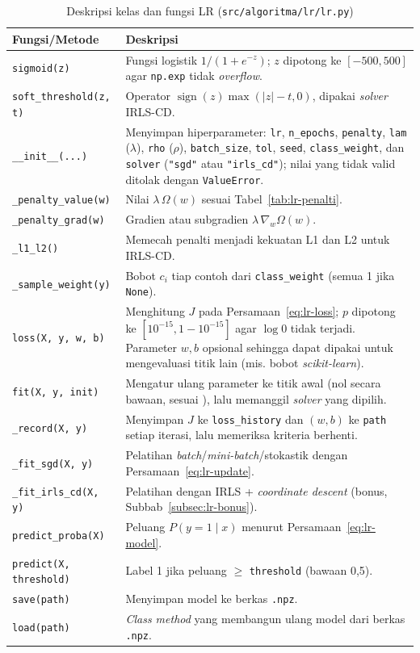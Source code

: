 \begin{table}[H]
	\centering
	\caption{Deskripsi kelas dan fungsi LR (\texttt{src/algoritma/lr/lr.py})}
	\label{tab:lr-fungsi}
	\small
	\begin{tabularx}{\textwidth}{l Y}
		\toprule
		\textbf{Fungsi/Metode} & \textbf{Deskripsi} \\
		\midrule
		\texttt{sigmoid(z)} & Fungsi logistik $1/(1+e^{-z})$; $z$ dipotong ke $[-500, 500]$ agar \texttt{np.exp} tidak \textit{overflow}. \\
		\texttt{soft\_threshold(z, t)} & Operator $\operatorname{sign}(z)\max(|z|-t, 0)$, dipakai \textit{solver} IRLS-CD. \\
		\texttt{\_\_init\_\_(...)} & Menyimpan hiperparameter: \texttt{lr}, \texttt{n\_epochs}, \texttt{penalty}, \texttt{lam} ($\lambda$), \texttt{rho} ($\rho$), \texttt{batch\_size}, \texttt{tol}, \texttt{seed}, \texttt{class\_weight}, dan \texttt{solver} (\texttt{"sgd"} atau \texttt{"irls\_cd"}); nilai yang tidak valid ditolak dengan \texttt{ValueError}. \\
		\texttt{\_penalty\_value(w)} & Nilai $\lambda\,\Omega(w)$ sesuai Tabel~\ref{tab:lr-penalti}. \\
		\texttt{\_penalty\_grad(w)} & Gradien atau subgradien $\lambda\,\nabla_w\Omega(w)$. \\
		\texttt{\_l1\_l2()} & Memecah penalti menjadi kekuatan L1 dan L2 untuk IRLS-CD. \\
		\texttt{\_sample\_weight(y)} & Bobot $c_i$ tiap contoh dari \texttt{class\_weight} (semua 1 jika \texttt{None}). \\
		\texttt{loss(X, y, w, b)} & Menghitung $J$ pada Persamaan~\eqref{eq:lr-loss}; $p$ dipotong ke $[10^{-15}, 1-10^{-15}]$ agar $\log 0$ tidak terjadi. Parameter $w, b$ opsional sehingga dapat dipakai untuk mengevaluasi titik lain (mis. bobot \textit{scikit-learn}). \\
		\texttt{fit(X, y, init)} & Mengatur ulang parameter ke titik awal (nol secara bawaan, sesuai \cite{khodra-lr-sga}), lalu memanggil \textit{solver} yang dipilih. \\
		\texttt{\_record(X, y)} & Menyimpan $J$ ke \texttt{loss\_history} dan $(w, b)$ ke \texttt{path} setiap iterasi, lalu memeriksa kriteria berhenti. \\
		\texttt{\_fit\_sgd(X, y)} & Pelatihan \textit{batch}/\textit{mini-batch}/stokastik dengan Persamaan~\eqref{eq:lr-update}. \\
		\texttt{\_fit\_irls\_cd(X, y)} & Pelatihan dengan IRLS + \textit{coordinate descent} (bonus, Subbab~\ref{subsec:lr-bonus}). \\
		\texttt{predict\_proba(X)} & Peluang $P(y=1 \mid x)$ menurut Persamaan~\eqref{eq:lr-model}. \\
		\texttt{predict(X, threshold)} & Label 1 jika peluang $\ge$ \texttt{threshold} (bawaan 0,5). \\
		\texttt{save(path)} & Menyimpan model ke berkas \texttt{.npz}. \\
		\texttt{load(path)} & \textit{Class method} yang membangun ulang model dari berkas \texttt{.npz}. \\
		\bottomrule
	\end{tabularx}
\end{table}


